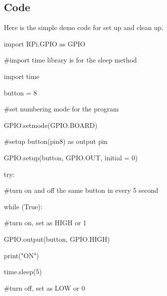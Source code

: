 \documentclass[onecolumn, draftclsnofoot,10pt, compsoc]{IEEEtran}
\begin{document}
\subsection{Code}
Here is the simple demo code for set up and clean up.
\begin{flushleft}
import RPi.GPIO as GPIO
\end{flushleft}
\begin{flushleft}
\#import time library is for the sleep method
\end{flushleft}
\begin{flushleft}
import time
\end{flushleft}
\begin{flushleft}
button = 8
\end{flushleft}
\begin{flushleft}
\#set numbering mode for the program
\end{flushleft}
\begin{flushleft}
GPIO.setmode(GPIO.BOARD)
\end{flushleft}
\begin{flushleft}
\#setup button(pin8) as output pin
\end{flushleft}
\begin{flushleft}
GPIO.setup(button, GPIO.OUT, initial = 0)
\end{flushleft}
\begin{flushleft}
try:
\end{flushleft}
		\begin{flushleft}
    \quad \#turn on and off the same button in every 5 second
		\end{flushleft}
		\begin{flushleft}
    \quad while (True):
		\end{flushleft}
				\begin{flushleft}
        \quad \quad \#turn on, set as HIGH or 1
				\end{flushleft}
				\begin{flushleft}
				\quad \quad GPIO.output(button, GPIO.HIGH)
				\end{flushleft}
				\begin{flushleft}
				\quad \quad print("ON")
				\end{flushleft}
				\begin{flushleft}
				\quad \quad time.sleep(5)
				\end{flushleft}
				\begin{flushleft}
				\quad \quad \#turn off, set as LOW or 0
				\end{flushleft}
\end{document}
